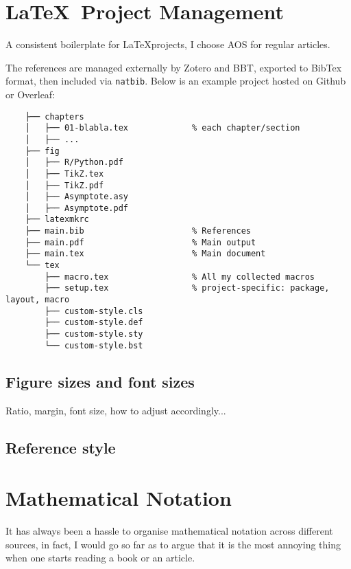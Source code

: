 \newpage


\section{\LaTeX\ Project Management}

A consistent boilerplate for \LaTeX projects,
I choose AOS for regular articles.

The references are managed externally by Zotero and BBT,
exported to BibTex format,
then included via \verb|natbib|.
Below is an example project hosted on Github or Overleaf:

\begin{Verbatim}
    ├── chapters
    │   ├── 01-blabla.tex             % each chapter/section
    │   ├── ...
    ├── fig
    │   ├── R/Python.pdf
    │   ├── TikZ.tex
    │   ├── TikZ.pdf
    │   ├── Asymptote.asy
    │   ├── Asymptote.pdf
    ├── latexmkrc
    ├── main.bib                      % References
    ├── main.pdf                      % Main output
    ├── main.tex                      % Main document
    └── tex
        ├── macro.tex                 % All my collected macros
        ├── setup.tex                 % project-specific: package, layout, macro
        ├── custom-style.cls
        ├── custom-style.def
        ├── custom-style.sty
        └── custom-style.bst
\end{Verbatim}

\subsection{Figure sizes and font sizes}

Ratio, margin, font size, how to adjust accordingly...

\subsection{Reference style}

\newpage

\section{Mathematical Notation}

It has always been a hassle to organise mathematical notation across different sources,
in fact, I would go so far as to argue that it is the most annoying thing
when one starts reading a book or an article.

